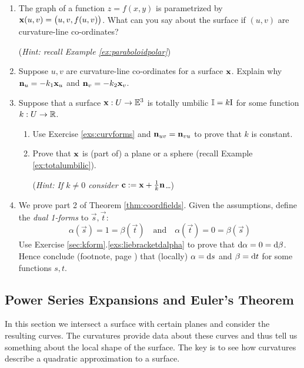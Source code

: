 \begin{exercises}{}{}
\begin{enumerate}
	  
  \item The graph of a function $z=f(x,y)$ is parametrized by ${\mathbf{x}}(u,v)=\bigl(u,v,f(u,v)\bigr)$. What can you say about the surface if $(u,v)$ are curvature-line co-ordinates?\par
  (\emph{Hint: recall Example \ref{ex:paraboloidpolar}})
  
  
  \item\label{exs:curvforms} Suppose $u,v$ are curvature-line co-ordinates for a surface ${\mathbf{x}}$. Explain why ${\mathbf{n}}_u=-k_1{\mathbf{x}}_u$ and ${\mathbf{n}}_v=-k_2{\mathbf{x}}_v$.


	\item\label{exs:totallyumbilic} Suppose that a surface ${\mathbf{x}}:U\to\mathbb{E}^3$ is totally umbilic $\mathbb{I}=k\mathrm{I}$ for some function $k:U\to\mathbb{R}$.
	\begin{enumerate}
	  \item Use Exercise \ref{exs:curvforms} and ${\mathbf{n}}_{uv}={\mathbf{n}}_{vu}$ to prove that $k$ is constant.
	  \item Prove that ${\mathbf{x}}$ is (part of) a plane or a sphere (recall Example \ref{ex:totalumbilic}).\par
	  (\emph{Hint: If $k\neq 0$ consider ${\mathbf{c}}:={\mathbf{x}}+\frac 1k{\mathbf{n}}$\ldots})
	\end{enumerate}


	\item\label{exs:coordfields} We prove part 2 of Theorem \ref{thm:coordfields}. Given the assumptions, define the \emph{dual 1-forms} to $\vec s,\vec t$:
  \[
  	\alpha(\vec s)=1=\beta(\vec t) \quad\text{and}\quad \alpha(\vec t)=0=\beta(\vec s)
  \]
  Use Exercise \ref*{sec:kform}.\ref{exs:liebracketdalpha} to prove that $\mathrm{d}\alpha=0=\mathrm{d}\beta$. Hence conclude  (footnote, page \pageref{fn:poincare}) that (locally) $\alpha={\mathrm{d} s}$ and $\beta={\mathrm{d} t}$ for some functions $s,t$.

\end{enumerate}
\end{exercises}

\clearpage



\subsection{Power Series Expansions and Euler's Theorem}\label{sec:eulersthm}

In this section we intersect a surface with certain planes and consider the resulting curves. The curvatures provide data about these curves and thus tell us something about the local shape of the surface. The key is to see how curvatures describe a quadratic approximation to a surface.\par

